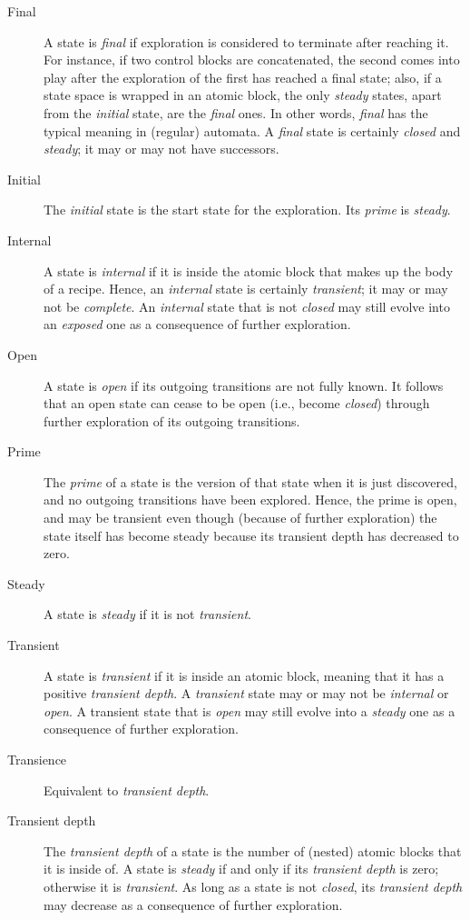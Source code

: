 \documentclass{article}
\begin{document}
\begin{description}
\item[Final] A state is \emph{final} if exploration is considered to terminate after reaching it. For instance, if two control blocks are concatenated, the second comes into play after the exploration of the first has reached a final state; also, if a state space is wrapped in an atomic block, the only \emph{steady} states, apart from the \emph{initial} state, are the \emph{final} ones. In other words, \emph{final} has the typical meaning in (regular) automata. A \emph{final} state is certainly \emph{closed} and \emph{steady}; it may or may not have successors.

\item[Initial] The \emph{initial} state is the start state for the exploration. Its \emph{prime} is \emph{steady}.

\item[Internal] A state is \emph{internal} if it is inside the atomic block that makes up the body of a recipe. Hence, an \emph{internal} state is certainly \emph{transient}; it may or may not be \emph{complete}. An \emph{internal} state that is not \emph{closed} may still evolve into an \emph{exposed} one as a consequence of further exploration.

\item[Open] A state is \emph{open} if its outgoing transitions are not fully known. It follows that an open state can cease to be open (i.e., become \emph{closed}) through further exploration of its outgoing transitions.

\item[Prime] The \emph{prime} of a state is the version of that state when it is just discovered, and no outgoing transitions have been explored. Hence, the prime is open, and may be transient even though (because of further exploration) the state itself has become steady because its transient depth has decreased to zero.

\item[Steady] A state is \emph{steady} if it is not \emph{transient}.

\item[Transient] A state is \emph{transient} if it is inside an atomic block, meaning that it has a positive \emph{transient depth}. A \emph{transient} state may or may not be \emph{internal} or \emph{open}. A transient state that is \emph{open} may still evolve into a \emph{steady} one as a consequence of further exploration.

\item[Transience] Equivalent to \emph{transient depth}.

\item[Transient depth] The \emph{transient depth} of a state is the number of (nested) atomic blocks that it is inside of. A state is \emph{steady} if and only if its \emph{transient depth} is zero; otherwise it is \emph{transient}. As long as a state is not \emph{closed}, its \emph{transient depth} may decrease as a consequence of further exploration.
\end{description}
\end{document}
